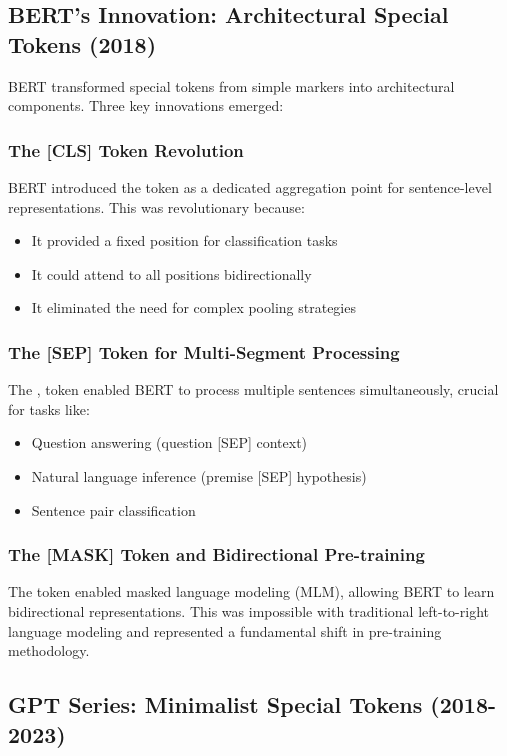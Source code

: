 \subsection{BERT's Innovation: Architectural Special Tokens (2018)}

BERT \citep{devlin2018bert} transformed special tokens from simple markers into architectural components. Three key innovations emerged:

\subsubsection{The [CLS] Token Revolution}
BERT introduced the \cls{} token as a dedicated aggregation point for sentence-level representations. This was revolutionary because:
\begin{itemize}
\item It provided a fixed position for classification tasks
\item It could attend to all positions bidirectionally
\item It eliminated the need for complex pooling strategies
\end{itemize}

\subsubsection{The [SEP] Token for Multi-Segment Processing}
The \sep{} token enabled BERT to process multiple sentences simultaneously, crucial for tasks like:
\begin{itemize}
\item Question answering (question [SEP] context)
\item Natural language inference (premise [SEP] hypothesis)
\item Sentence pair classification
\end{itemize}

\subsubsection{The [MASK] Token and Bidirectional Pre-training}
The \mask{} token enabled masked language modeling (MLM), allowing BERT to learn bidirectional representations. This was impossible with traditional left-to-right language modeling and represented a fundamental shift in pre-training methodology.

\subsection{GPT Series: Minimalist Special Tokens (2018-2023)}

